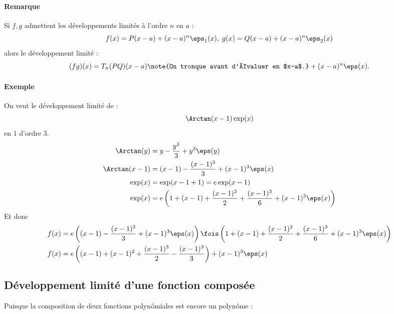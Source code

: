 \documentclass{mybourbaki}
\begin{document}
\paragraph{Remarque}Si $f,g$ admettent les développements limités à l'ordre $n$ en $a$ : \[ f(x) = P(x-a) + (x-a)^{n}\eps_1(x), \; g(x) = Q(x-a) + (x-a)^{n} \eps_2(x)\]alors le développement limité : \[ (fg)(x)  = T_n(PQ)(x-a)\note{On tronque avant d'évaluer en $x-a$.} + (x-a)^{n}\eps(x). \]

\paragraph{Exemple}On veut le développement limité de : \[ \Arctan(x-1)\exp(x)\]en $1$ d'ordre $3$.
\begin{align*}
\Arctan(y) &= y - \frac{y^{3}}{3} +y^{3}\eps(y) \\ 
\Arctan(x-1) &= (x-1) - \frac{(x-1)^{3}}{3}+(x-1)^{3}\eps(x) \\
\exp(x) &= \exp(x-1+1) = e\exp(x-1) \\
\exp(x) &= e\left(  1 + (x-1) + \frac{(x-1)^{2}}{2} + \frac{(x-1)^{3}}{6} + (x-1)^{3}\eps(x)\right)
\end{align*}
Et donc 
\begin{align*}
f(x) &= e\left( (x-1) - \frac{(x-1)^{3}}{3} + (x-1)^{3}\eps(x) \right)\fois \left( 1 + (x-1) + \frac{(x-1)^{2}}{2} + \frac{(x-1)^{3}}{6} + (x-1)^{3}\eps(x) \right)\\
f(x) &= e\left( (x-1) + (x-1)^{2} + \frac{(x-1)^{3}}{2} - \frac{(x-1)^{3}}{3} \right) + (x-1)^{3}\eps(x)
\end{align*}

\subsection{Développement limité d'une fonction composée}
Puisque la composition de deux fonctions polynômiales est encore un polynôme :
\end{document}
